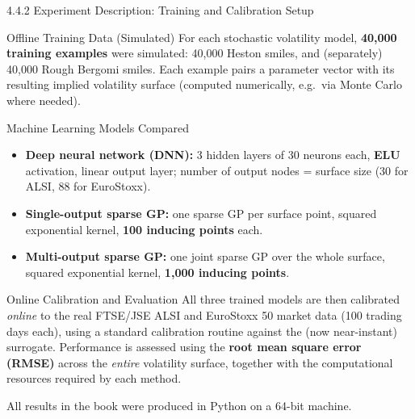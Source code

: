 \documentclass[aspectratio=169,10pt]{beamer}
\begin{document}
\begin{frame}[allowframebreaks]{4.4.2 Experiment Description: Training and Calibration Setup}

\begin{block}{Offline Training Data (Simulated)}
For each stochastic volatility model, \textbf{40{,}000 training
examples} were simulated: 40{,}000 Heston smiles, and (separately)
40{,}000 Rough Bergomi smiles. Each example pairs a parameter vector with
its resulting implied volatility surface (computed numerically, e.g.\ via
Monte Carlo where needed).
\end{block}

\begin{block}{Machine Learning Models Compared}
\begin{itemize}
  \item \textbf{Deep neural network (DNN):} 3 hidden layers of 30 neurons
        each, \textbf{ELU} activation, linear output layer; number of
        output nodes = surface size (30 for ALSI, 88 for EuroStoxx).
  \item \textbf{Single-output sparse GP:} one sparse GP per surface
        point, squared exponential kernel, \textbf{100 inducing points}
        each.
  \item \textbf{Multi-output sparse GP:} one joint sparse GP over the
        whole surface, squared exponential kernel,
        \textbf{1{,}000 inducing points}.
\end{itemize}
\end{block}

\framebreak

\begin{block}{Online Calibration and Evaluation}
All three trained models are then calibrated \emph{online} to the real
FTSE/JSE ALSI and EuroStoxx 50 market data (100 trading days each), using
a standard calibration routine against the (now near-instant) surrogate.
Performance is assessed using the \textbf{root mean square error (RMSE)}
across the \emph{entire} volatility surface, together with the
computational resources required by each method.
\end{block}

All results in the book were produced in Python on a 64-bit machine.

\end{frame}
\end{document}
